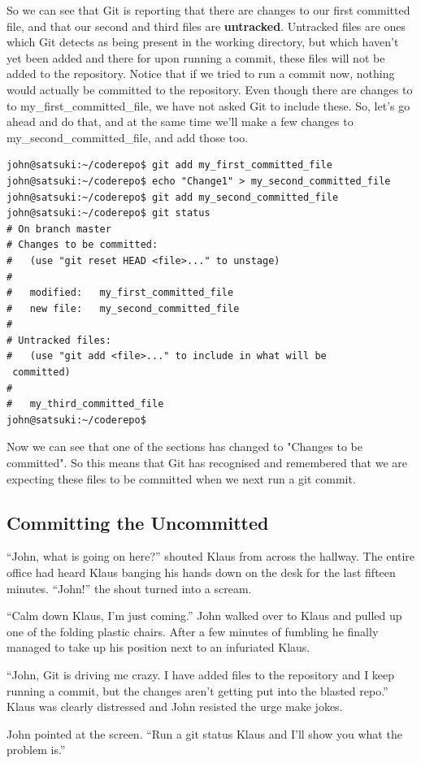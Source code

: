 So we can see that Git is reporting that there are changes to our first committed file, and that our second and third files are \textbf{untracked}.  Untracked files are ones which Git detects as being present in the working directory, but which haven't yet been added and there for upon running a commit, these files will not be added to the repository.  Notice that if we tried to run a commit now, nothing would actually be committed to the repository.  Even though there are changes to to my\_first\_committed\_file, we have not asked Git to include these.  So, let's go ahead and do that, and at the same time we'll make a few changes to my\_second\_committed\_file, and add those too.

\begin{Verbatim}[frame=leftline,framerule=1mm,fontsize=\relsize{-3}] 
john@satsuki:~/coderepo$ git add my_first_committed_file
john@satsuki:~/coderepo$ echo "Change1" > my_second_committed_file 
john@satsuki:~/coderepo$ git add my_second_committed_file
john@satsuki:~/coderepo$ git status
# On branch master
# Changes to be committed:
#   (use "git reset HEAD <file>..." to unstage)
#
#	modified:   my_first_committed_file
#	new file:   my_second_committed_file
#
# Untracked files:
#   (use "git add <file>..." to include in what will be 
 committed)
#
#	my_third_committed_file
john@satsuki:~/coderepo$ 
\end{Verbatim} 

Now we can see that one of the sections has changed to "Changes to be committed".  So this means that Git has recognised and remembered that we are expecting these files to be committed when we next run a git commit.  

\subsection{Committing the Uncommitted}

\begin{trenches}
``John, what is going on here?'' shouted Klaus from across the hallway.  The entire office had heard Klaus banging his hands down on the desk for the last fifteen minutes.  ``John!'' the shout turned into a scream.

``Calm down Klaus, I'm just coming.''  John walked over to Klaus and pulled up one of the folding plastic chairs.  After a few minutes of fumbling he finally managed to take up his position next to an infuriated Klaus.

``John, Git is driving me crazy.  I have added files to the repository and I keep running a commit, but the changes aren't getting put into the blasted repo.''  Klaus was clearly distressed and John resisted the urge make jokes.

John pointed at the screen.  ``Run a git status Klaus and I'll show you what the problem is.''
\end{trenches}

